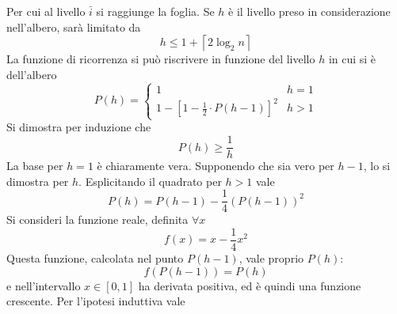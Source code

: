 Per cui al livello $
\bar{i}
$ si raggiunge la foglia.
Se $h$ è il livello preso in considerazione nell'albero, sarà limitato da
\begin{equation*}
    h \leq 1 +
    \left\lceil 
        2 \log_2 n
    \right\rceil
\end{equation*}
La funzione di ricorrenza si può riscrivere in funzione del livello $h$ in cui si è dell'albero
\begin{equation*}
    P(h) =
    \begin{cases}
        1 & h = 1
        \\
        1 - 
        \left[ 
            1 -
            \frac{1}{2}
            \cdot
            P\left( 
                h - 1
            \right)
        \right]^2
        &
        h > 1
    \end{cases}
\end{equation*}
Si dimostra per induzione che
\begin{equation*}
    P(h) \geq
    \frac{1}{h}
\end{equation*}
La base per $h=1$ è chiaramente vera.
Supponendo che sia vero per $h-1$, lo si dimostra per $h$.
Esplicitando il quadrato per $h>1$ vale
\begin{equation*}
    P(h) =
    P(h-1)
    -
    \frac{1}{4}
    \left( 
        P
        (h-1)
    \right)
    ^2
\end{equation*}
Si consideri la funzione reale, definita $\forall x$
\begin{equation*}
    f(x) = x - \frac{1}{4} x^2
\end{equation*}
Questa funzione, calcolata nel punto $
    P(h-1)
$, vale proprio $
    P(h)
$:
\begin{equation*}
    f(
        P(h-1)
    ) = 
    P(h)
\end{equation*}
e nell'intervallo $x \in [0,1]$ ha derivata positiva, ed è quindi una funzione crescente.
Per l'ipotesi induttiva vale
